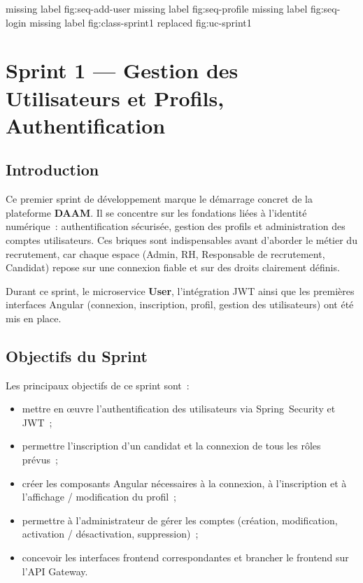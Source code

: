 missing label fig:seq-add-user missing label fig:seq-profile missing label fig:seq-login missing label fig:class-sprint1 replaced fig:uc-sprint1 %
\chapter{Sprint 1 --- Gestion des Utilisateurs et Profils, Authentification}

\section{Introduction}

Ce premier sprint de développement marque le démarrage concret de la plateforme
\textbf{DAAM}. Il se concentre sur les fondations liées à l'identité numérique~:
authentification sécurisée, gestion des profils et administration des comptes
utilisateurs. Ces briques sont indispensables avant d'aborder le métier du
recrutement, car chaque espace (Admin, RH, Responsable de recrutement,
Candidat) repose sur une connexion fiable et sur des droits clairement
définis.

Durant ce sprint, le microservice \textbf{User}, l'intégration JWT ainsi que
les premières interfaces Angular (connexion, inscription, profil, gestion
des utilisateurs) ont été mis en place.


\section{Objectifs du Sprint}

Les principaux objectifs de ce sprint sont~:
\begin{itemize}
  \item mettre en œuvre l'authentification des utilisateurs via
        Spring~Security et JWT~;
  \item permettre l'inscription d'un candidat et la connexion de tous les
        rôles prévus~;
  \item créer les composants Angular nécessaires à la connexion, à
        l'inscription et à l'affichage / modification du profil~;
  \item permettre à l'administrateur de gérer les comptes (création,
        modification, activation / désactivation, suppression)~;
  \item concevoir les interfaces frontend correspondantes et brancher le
        frontend sur l'API Gateway.
\end{itemize}


